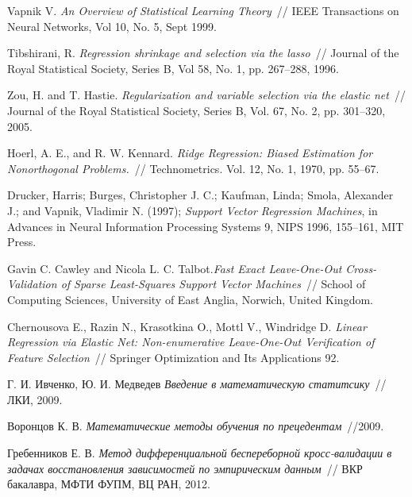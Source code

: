 \begin{thebibliography}{99}
 Vapnik V. \textit{An Overview of Statistical Learning Theory}~// IEEE Transactions on Neural Networks, Vol 10, No. 5, Sept 1999.

 Tibshirani, R. \textit{Regression shrinkage and selection via the lasso}~// Journal of the Royal Statistical Society, Series B, Vol 58, No. 1, pp. 267–288, 1996.

 Zou, H. and T. Hastie. \textit{Regularization and variable selection via the elastic net}~// Journal of the Royal Statistical Society, Series B, Vol. 67, No. 2, pp. 301–320, 2005.

 Hoerl, A. E., and R. W. Kennard. \textit{Ridge Regression: Biased Estimation for Nonorthogonal Problems.}~// Technometrics. Vol. 12, No. 1, 1970, pp. 55–67.

 Drucker, Harris; Burges, Christopher J. C.; Kaufman, Linda; Smola, Alexander J.; and Vapnik, Vladimir N. (1997); \textit{Support Vector Regression Machines}, in Advances in Neural Information Processing Systems 9, NIPS 1996, 155–161, MIT Press.

 Gavin C. Cawley and Nicola L. C. Talbot.\textit{Fast Exact Leave-One-Out Cross-Validation of Sparse Least-Squares Support Vector Machines}~// School of Computing Sciences, University of East Anglia, Norwich, United Kingdom.

 Chernousova E., Razin N., Krasotkina O., Mottl V., Windridge D. \textit{Linear Regression via Elastic Net: Non-enumerative Leave-One-Out Verification of Feature Selection}~// Springer Optimization and Its Applications 92.

 Г. И. Ивченко, Ю. И. Медведев \textit{Введение в математическую статитсику}~// ЛКИ, 2009.

 Воронцов К. В. \textit{Математические методы обучения по прецедентам}~//2009.

 Гребенников Е. В. \textit{Метод дифференциальной беспереборной кросс-валидации в задачах восстановления зависимостей по эмпирическим данным}~// ВКР бакалавра, МФТИ ФУПМ, ВЦ РАН, 2012.
\end{thebibliography}